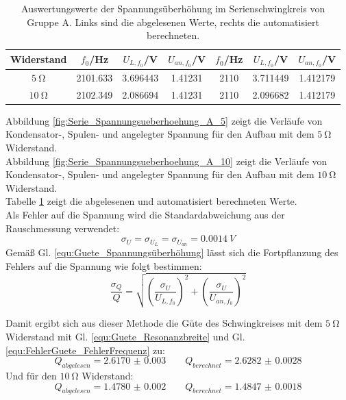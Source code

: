 \documentclass[12pt,a4paper]{article}
\begin{document}
\begin{table}
\centering
\begin{tabular}{|c|c|c|c||c|c|c|}
\hline
Widerstand & $f_0$/Hz & $U_{L, f_0}$/V & $U_{an, f_0}$/V & $f_0$/Hz & $U_{L, f_0}$/V & $U_{an, f_0}$/V \\
\hline
$\SI{5}{\ohm}$ & 2101.633 & 3.696443 & 1.41231 & 2110 & 3.711449 & 1.412179 \\
\hline
$\SI{10}{\ohm}$ & 2102.349 & 2.086694 & 1.41231 & 2110 & 2.096682 & 1.412179 \\
\hline
\end{tabular}
\caption{Auswertungswerte der Spannungsüberhöhung im Serienschwingkreis von Gruppe A. Links sind die abgelesenen Werte, rechts die automatisiert berechneten.}
\label{tab:Spannungsueberhoehung_A}
\end{table}

Abbildung \ref{fig:Serie_Spannungsueberhoehung_A_5} zeigt die Verläufe von Kondensator-, Spulen- und angelegter Spannung für den Aufbau mit dem $\SI{5}{\ohm}$ Widerstand.\\
Abbildung \ref{fig:Serie_Spannungsueberhoehung_A_10} zeigt die Verläufe von Kondensator-, Spulen- und angelegter Spannung für den Aufbau mit dem $\SI{10}{\ohm}$ Widerstand.\\ 
Tabelle \ref{tab:Spannungsueberhoehung_A} zeigt die abgelesenen und automatisiert berechneten Werte.\\
Als Fehler auf die Spannung wird die Standardabweichung aus der Rauschmessung verwendet:
\begin{equation*}
\sigma _U = \sigma _{U_L} = \sigma _{U_{an}} = \SI{0.0014}{V}
\end{equation*}
Gemäß Gl. \ref{equ:Guete_Spannungsüberhöhung} lässt sich die Fortpflanzung des Fehlers auf die Spannung wie folgt bestimmen:
\begin{equation}
\dfrac{\sigma _Q}{Q} = \sqrt{\left( \dfrac{\sigma _U}{U_{L, f_0}} \right)^2 + \left( \dfrac{\sigma _U}{U_{an, f_0}} \right)^2}
\end{equation}

Damit ergibt sich aus dieser Methode die Güte des Schwingkreises mit dem $\SI{5}{\ohm}$ Widerstand mit Gl. \ref{equ:Guete_Resonanzbreite} und Gl. \ref{equ:FehlerGuete_FehlerFrequenz} zu:
\begin{equation*}
Q_{abgelesen} = \num{2.6170(30)} \qquad Q_{berechnet} = \num{2.6282(28)}
\end{equation*}
Und für den $\SI{10}{\ohm}$ Widerstand:
\begin{equation*}
Q_{abgelesen} = \num{1.4780(20)} \qquad Q_{berechnet} = \num{1.4847(18)}
\end{equation*}
\end{document}
